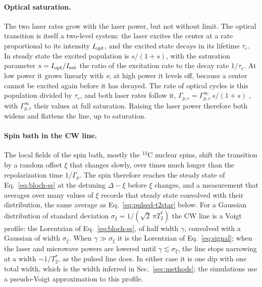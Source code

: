 \paragraph{Optical saturation.} The two laser rates grow with the laser power, but not without limit. The optical
transition is itself a two-level system: the laser excites the center at a rate proportional to its intensity
$I_{\rm opt}$, and the excited state decays in its lifetime $\tau_e$. In steady state the excited population is
$s/(1+s)$, with the saturation parameter $s=I_{\rm opt}/I_{\rm sat}$ the ratio of the excitation rate to the decay
rate $1/\tau_e$. At low power it grows linearly with $s$; at high power it levels off, because a center cannot be
excited again before it has decayed. The rate of optical cycles is this population divided by $\tau_e$, and both
laser rates follow it, $\Gamma_{p,c}=\Gamma_{p,c}^\infty\,s/(1+s)$ \cite{dreau2011}, with $\Gamma_{p,c}^\infty$ their
values at full saturation. Raising the laser power therefore both widens and flattens the line, up to saturation.

\paragraph{Spin bath in the CW line.} The local fields of the spin bath, mostly the $^{13}$C nuclear spins, shift
the transition by a random offset $\xi$ that changes slowly, over times much longer than the repolarization time
$1/\Gamma_p$. The spin therefore reaches the steady state of Eq.~\eqref{eq:bloch-ss} at the detuning $\Delta-\xi$
before $\xi$ changes, and a measurement that averages over many values of $\xi$ records that steady state convolved
with their distribution, the same average as Eq.~\eqref{eq:pulsed-t2star} below. For a Gaussian distribution of
standard deviation $\sigma_\xi=1/(\sqrt2\,\pi T_2^*)$ the CW line is a Voigt profile: the Lorentzian of
Eq.~\eqref{eq:bloch-ss}, of half width $\gamma$, convolved with a Gaussian of width $\sigma_\xi$. When
$\gamma\gg\sigma_\xi$ it is the Lorentzian of Eq.~\eqref{eq:signal}; when the laser and microwave powers are
lowered until $\gamma\lesssim\sigma_\xi$, the line stops narrowing at a width $\sim1/T_2^*$, as the pulsed line does.
In either case it is one dip with one total width, which is the width inferred in Sec.~\ref{sec:methods}; the
simulations use a pseudo-Voigt approximation to this profile.

